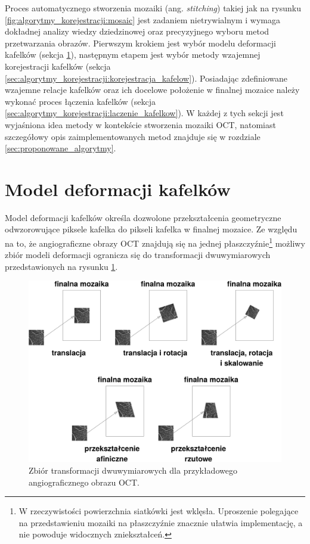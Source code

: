 Proces automatycznego stworzenia mozaiki (ang. \textit{stitching}) takiej jak na rysunku \ref{fig:algorytmy_korejestracji:mosaic} jest zadaniem nietrywialnym i wymaga dokładnej analizy wiedzy dziedzinowej oraz precyzyjnego wyboru metod przetwarzania obrazów. Pierwszym krokiem jest wybór modelu deformacji kafelków (sekcja \ref{sec:algorytmy_korejestracji:model_deformacji}), następnym etapem jest wybór metody wzajemnej korejestracji kafelków (sekcja \ref{sec:algorytmy_korejestracji:korejestracja_kafelow}). Posiadając zdefiniowane wzajemne relacje kafelków oraz ich docelowe położenie w finalnej mozaice należy wykonać proces łączenia kafelków (sekcja \ref{sec:algorytmy_korejestracji:laczenie_kafelkow}). W każdej z tych sekcji jest wyjaśniona idea metody w kontekście stworzenia mozaiki OCT, natomiast szczegółowy opis zaimplementowanych metod znajduje się w rozdziale \ref{sec:proponowane_algorytmy}.

\section{Model deformacji kafelków}
\label{sec:algorytmy_korejestracji:model_deformacji}

Model deformacji kafelków określa dozwolone przekształcenia geometryczne odwzorowujące piksele kafelka do pikseli kafelka w finalnej mozaice. Ze względu na to, że angiograficzne obrazy OCT znajdują się na jednej płaszczyźnie\footnote{W rzeczywistości powierzchnia siatkówki jest wklęsła. Uproszenie polegające na przedstawieniu mozaiki na płaszczyźnie znacznie ułatwia implementację, a nie powoduje widocznych zniekształceń.} możliwy zbiór modeli deformacji ogranicza  się do transformacji dwuwymiarowych przedstawionych na rysunku \ref{fig:algorytmy_korejestracji:trans}.

\begin{figure}[htb]
  \centering
  \includegraphics[width=\textwidth]{gfx/trans}
  \caption{Zbiór transformacji dwuwymiarowych dla przykładowego angiograficznego obrazu OCT.}
  \label{fig:algorytmy_korejestracji:trans}
\end{figure}

